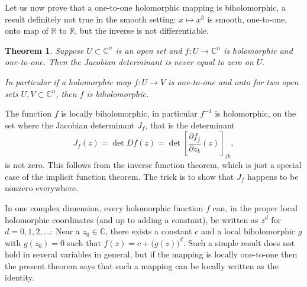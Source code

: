 \documentclass[12pt,openany]{book}
\newcommand{\C}{{\mathbb{C}}}
\newcommand{\R}{{\mathbb{R}}}
\theoremstyle{plain}
\newtheorem{thm}{Theorem}[section]
\theoremstyle{remark}
\theoremstyle{definition}
\theoremstyle{exercise}
\theoremstyle{example}
\begin{document}
Let us now prove that a one-to-one holomorphic
mapping is biholomorphic, a result definitely not true in the
smooth setting: $x \mapsto x^3$ is smooth, one-to-one, onto map
of $\R$ to $\R$, but the inverse is not differentiable.

\begin{thm} \label{thm:injective}
Suppose $U \subset \C^n$ is an open set and $f \colon U \to \C^n$ is
holomorphic and one-to-one.  Then the Jacobian determinant is never equal to zero 
on $U$.

In particular if a holomorphic map $f \colon U \to V$ is
one-to-one and onto for two open sets $U,V \subset \C^n$, then $f$ is
biholomorphic.
\end{thm}

The function $f$ is locally biholomorphic, in particular
$f^{-1}$ is holomorphic,
on the set where the Jacobian determinant $J_f$, that is the determinant
\begin{equation*}
J_f(z) = \det Df(z) = \det \left[ \frac{\partial f_j}{\partial z_k}(z)
\right]_{jk} ,
\end{equation*}
is not zero.  This follows from the inverse function theorem, which is just
a special case of the implicit function theorem.
The trick is to show that $J_f$ happens to be nonzero
everywhere.

In one complex dimension, every holomorphic function $f$ can, in
the proper local holomorphic coordinates (and up to adding a constant),
be written as $z^d$ for $d=0,1,2,\ldots$:
Near a $z_0 \in \C$,
there exists a constant $c$ and a local biholomorphic $g$
with $g(z_0) = 0$ such that
$f(z) = c + {\bigl( g(z) \bigr)}^d$.
Such a simple result
does not hold in several variables in general, but if the mapping is
locally one-to-one then the present theorem says that such a mapping can be
locally written as the identity.
\end{document}
